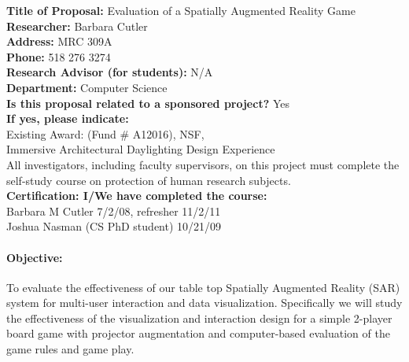 \documentclass[10pt]{article}
\begin{document}
\noindent
{\bf Title of Proposal:}  Evaluation of a Spatially Augmented Reality Game\\
{\bf Researcher:}   Barbara Cutler\\
{\bf Address:}  MRC 309A\\
{\bf Phone:} 518 276 3274\\
{\bf Research Advisor (for students):}  N/A \\
{\bf Department:}  Computer Science \\
{\bf Is this proposal related to a sponsored project?}  Yes \\
{\bf If yes,  please indicate:}  \\
Existing Award: (Fund \# A12016), NSF, \\
Immersive Architectural Daylighting Design Experience \\

\noindent
All investigators, including faculty supervisors, on this project must
complete the self-study course on protection of human research
subjects. \\
{\bf Certification:  I/We have completed the course:} \\
Barbara M Cutler 7/2/08, refresher 11/2/11 \\
Joshua Nasman (CS PhD student) 10/21/09

\paragraph{Objective:}
%
To evaluate the effectiveness of our table top Spatially Augmented
Reality (SAR) system for multi-user interaction and data
visualization.  Specifically we will study the effectiveness of the
visualization and interaction design for a simple 2-player board game
with projector augmentation and computer-based evaluation of the game
rules and game play.
\end{document}
